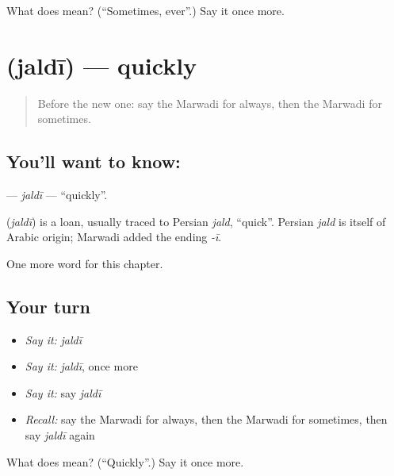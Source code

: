 \begin{tcolorbox}[breakable,colback=teal!4,colframe=teal!35!black,title={Before you move on}]
What does  mean? (\textquotedblleft{}Sometimes, ever\textquotedblright{}.) Say it once more.
\end{tcolorbox}
\section[\texorpdfstring{\mw{जल्दी} (jaldī)}{जल्दी (jaldī)}]{ (jaldī) — quickly}

\label{lesson:MW-C80-jaldi}



\begin{quote}
Before the new one: say the Marwadi for always, then the Marwadi for sometimes.
\end{quote}

\subsection*{You'll want to know: }
\textbf{} — \emph{jaldī} — \textquotedblleft{}quickly\textquotedblright{}.

\begin{cousinweb}
\textbf{} (\emph{jaldī}) is a loan, usually traced to Persian \emph{jald}, \textquotedblleft{}quick\textquotedblright{}. Persian \emph{jald} is itself of Arabic origin; Marwadi added the ending \emph{-ī}.
\end{cousinweb}

\begin{grammarlens}[title={What you've built}]
One more word for this chapter.
\end{grammarlens}

\subsection*{Your turn}
\begin{itemize}
\raggedright
  \item \emph{Say it:} \emph{jaldī}
  \item \emph{Say it:} \emph{jaldī}, once more
  \item \emph{Say it:} say \emph{jaldī}
  \item \emph{Recall:} say the Marwadi for always, then the Marwadi for sometimes, then say \emph{jaldī} again
\end{itemize}

\begin{tcolorbox}[breakable,colback=teal!4,colframe=teal!35!black,title={Before you move on}]
What does  mean? (\textquotedblleft{}Quickly\textquotedblright{}.) Say it once more.
\end{tcolorbox}
